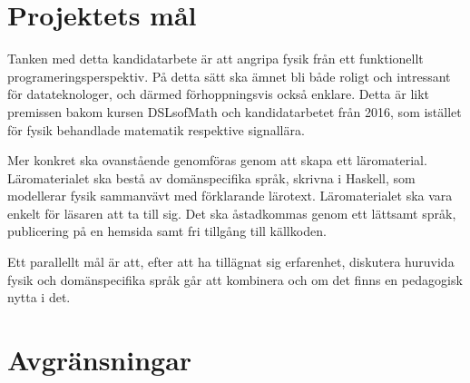 \section{Projektets mål}

\begin{draft}

Tanken med detta kandidatarbete är att angripa fysik från ett funktionellt
programeringsperspektiv. På detta sätt ska ämnet bli både roligt och intressant
för datateknologer, och därmed förhoppningsvis också enklare. Detta är likt
premissen bakom kursen DSLsofMath och kandidatarbetet från 2016, som istället
för fysik behandlade matematik respektive signallära.

Mer konkret ska ovanstående genomföras genom att skapa ett läromaterial.
Läromaterialet ska bestå av domänspecifika språk, skrivna i Haskell, som
modellerar fysik sammanvävt med förklarande lärotext. Läromaterialet ska vara
enkelt för läsaren att ta till sig. Det ska åstadkommas genom ett lättsamt
språk, publicering på en hemsida samt fri tillgång till källkoden.

Ett parallellt mål är att, efter att ha tillägnat sig erfarenhet, diskutera
huruvida fysik och domänspecifika språk går att kombinera och om det finns en
pedagogisk nytta i det.

\end{draft}

\section{Avgränsningar} \label{sec:avgransningar}

